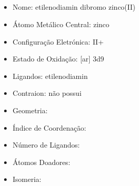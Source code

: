 \documentclass[12pt]{article}
\begin{document}
\noindent\begin{minipage}{\textwidth}
	
	\subsection{\ch{[Zn(en)2Br2]}}
	\begin{itemize}
   \item Nome:
   	etilenodiamin dibromo zinco(II)
   
   \item Átomo Metálico Central:
   	zinco
   	
   \item Configuração Eletrónica:
   	II+
   
   \item Estado de Oxidação:
   	[ar] 3d9
   
   \item Ligandos:
   	etilenodiamin
   
   \item Contraion:
   	não possui
   
   \item Geometria:
   	
   
   \item Índice de Coordenação: 
   
   
   \item Número de Ligandos:
   
   
   \item Átomos Doadores:
   	
   
   \item Isomeria:
	\end{itemize}
	
\end{minipage}

%	
%   	
%   
%   	
%   	
%   
%   
%   
%   
%   
%   
%   
%   
%   
%   
%   
%   
%   
%   
%   
%   
%	
\end{document}
